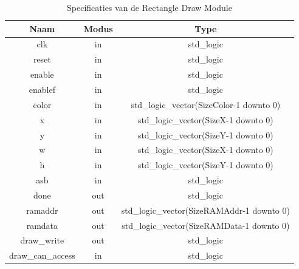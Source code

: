 \documentclass{scrreprt} %
\begin{document}
\begin{table}[H]
\centering
\caption{Specificaties van de Rectangle Draw Module}
\label{tab:spec-rect-draw}
\begin{tabular}{c c c}
	\hline\hline
 	Naam & Modus & Type\\
 	\hline	
	clk & in & std\_logic \\
	reset & in & std\_logic \\
	enable& in & std\_logic \\
	enablef& in & std\_logic \\
	color & in & std\_logic\_vector(SizeColor-1 downto 0) \\
	x & in & std\_logic\_vector(SizeX-1 downto 0) \\
	y & in & std\_logic\_vector(SizeY-1 downto 0) \\
	w & in & std\_logic\_vector(SizeX-1 downto 0) \\
	h & in & std\_logic\_vector(SizeY-1 downto 0) \\
	asb & in & std\_logic \\
	done & out & std\_logic \\
	ramaddr &out & std\_logic\_vector(SizeRAMAddr-1 downto 0) \\
	ramdata &out & std\_logic\_vector(SizeRAMData-1 downto 0) \\
	draw\_write &out & std\_logic \\
	draw\_can\_access & in & std\_logic \\
  	\hline
\end{tabular}
\end{table}
\end{document}
